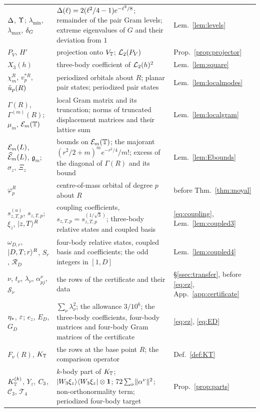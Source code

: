 \begin{longtable}{@{}>{\raggedright\arraybackslash}p{}>{\raggedright\arraybackslash}p{}>{\raggedright\arraybackslash}p{}@{}}
$\Delta$, $\Upsilon$; $\lambda_{\min}$, $\lambda_{\max}$, $\delta_G$ & $\Delta(\ell)=2(\ell^2/4-1)e^{-\ell^2/8}$; remainder of the
pair Gram levels; extreme eigenvalues of $G$ and their deviation from $1$ & Lem.~\ref{lem:levels}\\
$P_V$, $H'$ & projection onto $V_{\mathbb{T}}$; $\mathcal{L}_2(P_V)$ & Prop.~\ref{prop:projector}\\
$X_3(h)$ & three-body coefficient of $\mathcal{L}_2(h)^2$ & Lem.~\ref{lem:square}\\
$\chi^R_m$, $v_p^{*R}$, $\tilde u_p(R)$ & periodized orbitals about $R$; planar pair states; periodized pair states
& Lem.~\ref{lem:localmodes}\\
$\Gamma(R)$, $\Gamma^{(m)}(R)$; $\mu_m$, $\mathcal{E}_m(\mathbb{T})$ & local Gram matrix and its truncation; norms of truncated displacement
matrices and their lattice sum & Lem.~\ref{lem:localgram}\\
$\mathcal{E}_m(L)$, $\widehat{\mathcal{E}}_m(L)$, $\mathfrak g_m$; $\sigma_z$, $\Xi_z$ & bounds on $\mathcal{E}_m(\mathbb{T})$; the majorant
$(r^2/2+m)^me^{-r^2/4}/m!$; excess of the diagonal of $\Gamma(R)$ and its bound & Lem.~\ref{lem:Ebounds}\\
$\varphi_p^R$ & centre-of-mass orbital of degree $p$ about $R$ & before Thm.~\ref{thm:moyal}\\
$s^{(u)}_{z,T,p}$, $s_{z,T,p}$; $\xi_z$, $\lvert z,T\rangle^R$ & coupling coefficients, $s_{z,T,p}=s^{(1/\sqrt3)}_{z,T,p}$; three-body
relative states and coupled basis & \eqref{eq:coupling}, Lem.~\ref{lem:coupled3}\\
$\omega_{D,r}$, $\lvert D,T;r\rangle^R$, $S_r$, $\mathcal R_D$ & four-body relative states, coupled basis and coefficients; the odd
integers in $[1,D]$ & Lem.~\ref{lem:coupled4}\\
$\nu$, $t_\nu$, $\lambda_\nu$, $\alpha^\nu_{pj}$, $\mathcal S_\nu$ & the rows of the certificate and their data
& \S\ref{ssec:transfer}, before \eqref{eq:ez}, App.~\ref{app:certificate}\\
$\eta_{*}$, $\varepsilon$; $e_z$, $E_D$, $G_D$ & $\sum_\nu\lambda_\nu^2$; the allowance $3/10^6$; the three-body coefficients, four-body
matrices and four-body Gram matrices of the certificate & \eqref{eq:ez}, \eqref{eq:ED}\\
$F_\nu(R)$, $K_{\mathbb{T}}$ & the rows at the base point $R$; the comparison operator & Def.~\ref{def:KT}\\
$K_{\mathbb{T}}^{(k)}$, $Y_z$, $C_{3}$, $\mathcal C_3$, $\mathcal T_4$ & $k$-body part of $K_{\mathbb{T}}$; $\lvert W_3\xi_z\rangle\langle W_3\xi_z\rvert\otimes\mathbf{1}$;
$72\sum_\nu\lVert\alpha^\nu\rVert^2$; non-orthonormality term; periodized four-body target & Prop.~\ref{prop:parts}\\

\end{longtable}
